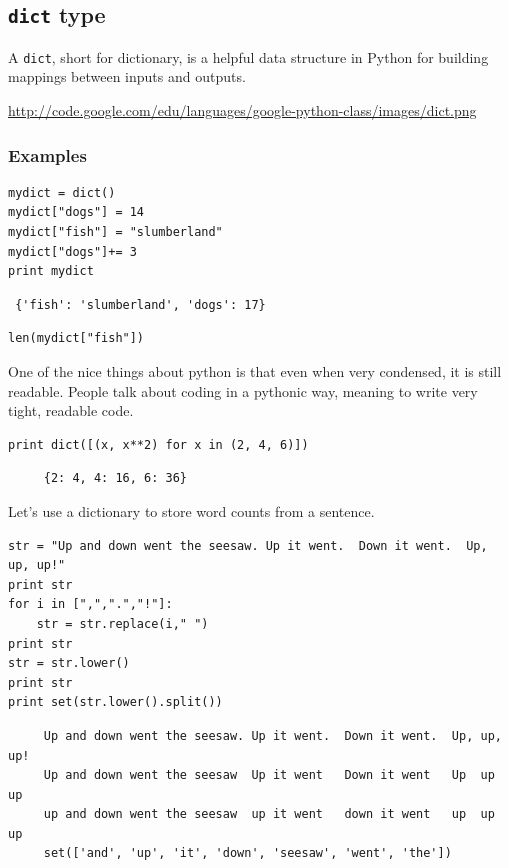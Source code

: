 \documentclass[11pt]{article}
\begin{document}
\subsection{\texttt{dict} type}
\label{sec-2-7}

   A \texttt{dict}, short for dictionary, is a helpful data structure in
   Python for building mappings between inputs and outputs.

\href{http://code.google.com/edu/languages/google-python-class/images/dict.png}{http://code.google.com/edu/languages/google-python-class/images/dict.png}
\subsubsection{Examples}
\label{sec-2-7-1}


\begin{verbatim}
mydict = dict()
mydict["dogs"] = 14
mydict["fish"] = "slumberland"
mydict["dogs"]+= 3
print mydict
\end{verbatim}

\begin{verbatim}
 {'fish': 'slumberland', 'dogs': 17}
\end{verbatim}


\begin{verbatim}
len(mydict["fish"])
\end{verbatim}


    One of the nice things about python is that even when very
    condensed, it is still readable.  People talk about coding in a
    pythonic way, meaning to write very tight, readable code.


\begin{verbatim}
print dict([(x, x**2) for x in (2, 4, 6)])
\end{verbatim}

\begin{verbatim}
     {2: 4, 4: 16, 6: 36}
\end{verbatim}

    Let's use a dictionary to store word counts from a sentence.


\begin{verbatim}
str = "Up and down went the seesaw. Up it went.  Down it went.  Up, up, up!"
print str
for i in [",",".","!"]:
    str = str.replace(i," ")
print str
str = str.lower()
print str
print set(str.lower().split())
\end{verbatim}

\begin{verbatim}
     Up and down went the seesaw. Up it went.  Down it went.  Up, up, up!
     Up and down went the seesaw  Up it went   Down it went   Up  up  up 
     up and down went the seesaw  up it went   down it went   up  up  up 
     set(['and', 'up', 'it', 'down', 'seesaw', 'went', 'the'])
\end{verbatim}
\end{document}
